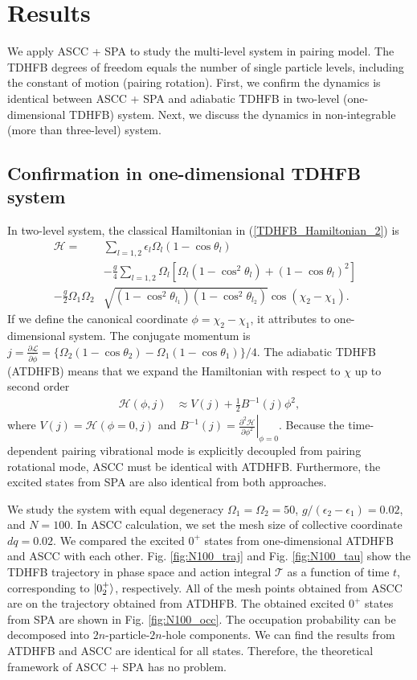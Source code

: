 \documentclass[%
superscriptaddress,
showpacs,
nofootinbib,
amsmath,amssymb,
aps,
prc,
twocolumn,
floatfix ]%
{revtex4-1}
\begin{document}
\section{Results}
We apply ASCC + SPA to study the multi-level system in pairing model. The TDHFB degrees of freedom equals the number of single particle levels, including the constant of motion (pairing rotation). First, we confirm the dynamics is identical between ASCC + SPA and adiabatic TDHFB in two-level (one-dimensional TDHFB) system. Next, we discuss the dynamics in non-integrable (more than three-level) system.  


\subsection{Confirmation in one-dimensional TDHFB system}
In two-level system, the classical Hamiltonian in (\ref{TDHFB_Hamiltonian_2}) is
\begin{align}
\mathcal{H} 
  =& \sum_{l=1,2} \epsilon_l\Omega_l(1- \cos{\theta}_l)& \nonumber \\ 
 &- \frac{g}{4}\sum_{l=1,2} \Omega_l [\Omega_l(1-\cos^2{\theta}_l)+(1-\cos{\theta}_l)^2] \nonumber \\
- \frac{g}{2} \Omega_{1}\Omega_{2}&\sqrt{(1-\cos^2{\theta}_{l_1})(1-\cos^2{\theta}_{l_2})}\cos{(\chi_{2}-\chi_{1})}   .
\end{align}
If we define the canonical coordinate $\phi=\chi_2-\chi_1$, it attributes to one-dimensional system. The conjugate momentum is $j= \frac{\partial\mathcal{L}}{\partial\dot{\phi}} = \{\Omega_2(1-\cos{\theta}_2) - \Omega_1(1-\cos{\theta}_1)\}/4$. The adiabatic TDHFB (ATDHFB) means that we expand the Hamiltonian with respect to $\chi$ up to second order
\begin{align}
  \mathcal{H}(\phi,j) &\approx V(j) + \frac{1}{2}B^{-1}(j)\phi^2,
\end{align}
where $V(j)=\mathcal{H}(\phi=0,j)$ and $B^{-1}(j)= \left. \frac{\partial^2\mathcal{H}}{\partial\phi^2} \right|_{\phi=0}$.
Because the time-dependent pairing vibrational mode is explicitly decoupled from pairing rotational mode, ASCC must be identical with ATDHFB. Furthermore, the excited states from SPA are also identical from both approaches.

We study the system with equal degeneracy $\Omega_1=\Omega_2=50$, $g/(\epsilon_2-\epsilon_1)=0.02$, and $N=100$. In ASCC calculation, we set the mesh size of collective coordinate $dq=0.02$. We compared the excited $0^+$ states from one-dimensional ATDHFB and ASCC with each other. Fig. \ref{fig:N100_traj} and Fig. \ref{fig:N100_tau} show the TDHFB trajectory in phase space and  action integral $\mathcal{T}$ as a function of time $t$, corresponding to $\ket{0_2^+}$, respectively. All of the mesh points obtained from ASCC are on the trajectory obtained from ATDHFB. The obtained excited $0^+$ states from SPA are shown in Fig. \ref{fig:N100_occ}. The occupation probability can be decomposed into $2n$-particle-$2n$-hole components. We can find the results from ATDHFB and ASCC are identical for all states. Therefore, the theoretical framework of ASCC + SPA has no problem.
\end{document}
